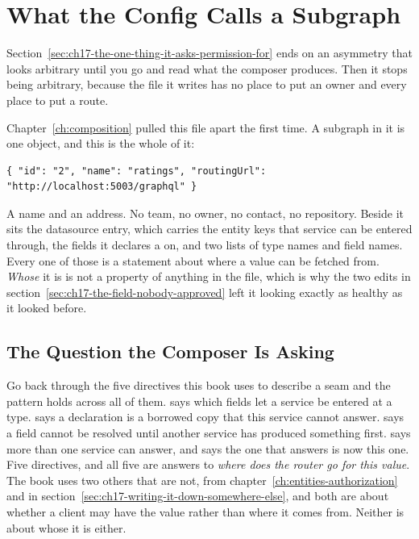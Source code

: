 \section{What the Config Calls a Subgraph}
\label{sec:ch17-what-the-config-calls-a-subgraph}

%
Section~\ref{sec:ch17-the-one-thing-it-asks-permission-for} ends on an
asymmetry that looks arbitrary until you go and read what the composer
produces. Then it stops being arbitrary, because the file it writes has no
place to put an owner and every place to put a route.

%
Chapter~\ref{ch:composition} pulled this file apart the first time. A subgraph
in it is one object, and this is the whole of it:

\begin{verbatim}
{ "id": "2", "name": "ratings", "routingUrl": "http://localhost:5003/graphql" }
\end{verbatim}

%
A name and an address. No team, no owner, no contact, no repository. Beside it
sits the datasource entry, which carries the entity keys that service can be
entered through, the fields it declares a  on, and two lists of
type names and field names. Every one of those is a statement about where a
value can be fetched from. \emph{Whose} it is is not a property of anything in
the file, which is why the two edits in
section~\ref{sec:ch17-the-field-nobody-approved} left it looking exactly as
healthy as it looked before.

\subsection{The Question the Composer Is Asking}

%
Go back through the five directives this book uses to describe a seam and the
pattern holds across all of them.  says which fields let a service
be entered at a type.  says a declaration is a borrowed copy
that this service cannot answer.  says a field cannot be
resolved until another service has produced something first. 
says more than one service can answer, and  says the one that
answers is now this one. Five directives, and all five are answers to
\emph{where does the router go for this value}. The book uses two others that
are not,  from chapter~\ref{ch:entities-authorization} and
 in section~\ref{sec:ch17-writing-it-down-somewhere-else},
and both are about whether a client may have the value rather than where it
comes from. Neither is about whose it is either.

